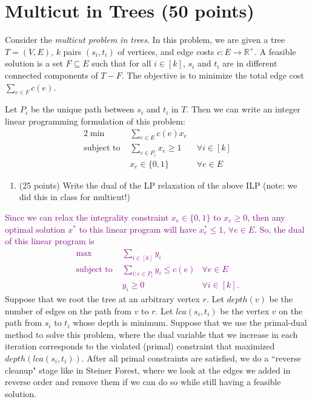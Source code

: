 \documentclass[11pt]{article}
\newcommand{\R}{\ensuremath{\mathbb R}}
\begin{document}
\section{Multicut in Trees (50 points)}
Consider the \emph{multicut problem in trees}.  In this problem, we are given a tree $T = (V, E)$, $k$ pairs $(s_i, t_i)$ of vertices, and edge costs $c : E \rightarrow \R^+$.  A feasible solution is a set $F \subseteq E$ such that for all $i \in [k]$, $s_i$ and $t_i$ are in different connected components of $T - F$.  The objective is to minimize the total edge cost $\sum_{e \in F} c(e)$.  

Let $P_i$ be the unique path between $s_i$ and $t_i$ in $T$.  Then we can write an integer linear programming formulation of this problem:
\begin{alignat*}{2}
\min  \quad & \sum_{e \in E} c(e) x_e \\
\text{subject to }  & \sum_{e \in P_i} x_e  \geq 1 \quad & \forall i \in [k] \\
& x_e \in \{0,1\} & \forall e \in E
\end{alignat*}

\begin{enumerate}
\item (25 points) Write the dual of the LP relaxation of the above ILP (note: we did this in class for multicut!)
\end{enumerate}

\textcolor{purple}{
    Since we can relax the integrality constraint $x_e \in \{0,1\}$ to $x_e \geq 0$, then any optimal solution $x^*$ to this linear program will have $x_e^*\leq 1$, $\forall e \in E$. So, the dual of this linear program is
    \begin{align}
        \max  \quad & \sum_{i \in [k]} y_i \\
    \text{subject to }  & \sum_{i: e\in P_i}y_i \leq c(e) & \forall e \in E \\
    & y_i \geq 0 & \forall i \in [k].
    \end{align}
}
Suppose that we root the tree at an arbitrary vertex $r$.  Let $depth(v)$ be the number of edges on the path from $v$ to $r$.  Let $lca(s_i, t_i)$ be the vertex $v$ on the path from $s_i$ to $t_i$ whose depth is minimum.  Suppose that we use the primal-dual method to solve this problem, where the dual variable that we increase in each iteration corresponds to the violated (primal) constraint that maximized $depth(lca(s_i, t_i))$.  After all primal constraints are satisfied, we do a ``reverse cleanup" stage like in Steiner Forest, where we look at the edges we added in reverse order and remove them if we can do so while still having a feasible solution.
\end{document}
